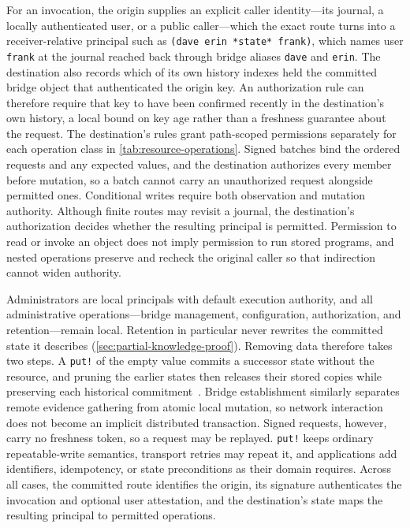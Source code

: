 For an invocation, the origin supplies an explicit caller identity---its journal, a locally authenticated user, or a public caller---which the exact route turns into a receiver-relative principal such as \texttt{(dave erin *state* frank)}, which names user \texttt{frank} at the journal reached back through bridge aliases \texttt{dave} and \texttt{erin}. The destination also records which of its own history indexes held the committed bridge object that authenticated the origin key. An authorization rule can therefore require that key to have been confirmed recently in the destination's own history, a local bound on key age rather than a freshness guarantee about the request. The destination's rules grant path-scoped permissions separately for each operation class in \cref{tab:resource-operations}. Signed batches bind the ordered requests and any expected values, and the destination authorizes every member before mutation, so a batch cannot carry an unauthorized request alongside permitted ones. Conditional writes require both observation and mutation authority. Although finite routes may revisit a journal, the destination's authorization decides whether the resulting principal is permitted. Permission to read or invoke an object does not imply permission to run stored programs, and nested operations preserve and recheck the original caller so that indirection cannot widen authority.

Administrators are local principals with default execution authority, and all administrative operations---bridge management, configuration, authorization, and retention---remain local. Retention in particular never rewrites the committed state it describes (\cref{sec:partial-knowledge-proof}). Removing data therefore takes two steps. A \texttt{put!} of the empty value commits a successor state without the resource, and pruning the earlier states then releases their stored copies while preserving each historical commitment~\cite{Crosby2009efficient}. Bridge establishment similarly separates remote evidence gathering from atomic local mutation, so network interaction does not become an implicit distributed transaction. Signed requests, however, carry no freshness token, so a request may be replayed. \texttt{put!} keeps ordinary repeatable-write semantics, transport retries may repeat it, and applications add identifiers, idempotency, or state preconditions as their domain requires. Across all cases, the committed route identifies the origin, its signature authenticates the invocation and optional user attestation, and the destination's state maps the resulting principal to permitted operations.


